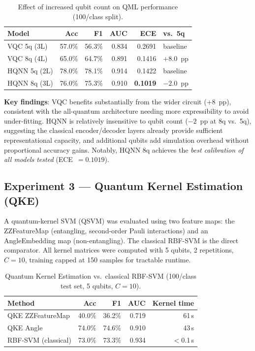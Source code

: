 \documentclass[journal]{IEEEtran}
\begin{document}
\begin{table}[H]
\centering
\caption{Effect of increased qubit count on QML performance (100/class split).}
\begin{tabular}{lrrrrl}
\toprule
\textbf{Model} & \textbf{Acc} & \textbf{F1} & \textbf{AUC} & \textbf{ECE} & \textbf{vs.\ 5q} \\
\midrule
VQC 5q (3L)  & 57.0\% & 56.3\% & 0.834 & 0.2691 & baseline \\
VQC 8q (4L)  & 65.0\% & 64.7\% & 0.891 & 0.1416 & $+8.0$~pp \\
\midrule
HQNN 5q (2L) & 78.0\% & 78.1\% & 0.914 & 0.1422 & baseline \\
HQNN 8q (3L) & 76.0\% & 75.3\% & 0.910 & \textbf{0.1019} & $-2.0$~pp \\
\bottomrule
\end{tabular}
\end{table}

\noindent\textbf{Key findings}: VQC benefits substantially from the wider circuit
($+8$~pp), consistent with the all-quantum architecture needing more
expressibility to avoid under-fitting. HQNN is relatively insensitive to qubit
count ($-2$~pp at 8q vs.\ 5q), suggesting the classical encoder/decoder layers
already provide sufficient representational capacity, and additional qubits add
simulation overhead without proportional accuracy gains. Notably, HQNN 8q
achieves the \emph{best calibration of all models tested} (ECE~$= 0.1019$).

\subsection{Experiment 3 — Quantum Kernel Estimation (QKE)}

A quantum-kernel SVM (QSVM) was evaluated using two feature maps: the
ZZFeatureMap (entangling, second-order Pauli interactions) and an AngleEmbedding
map (non-entangling). The classical RBF-SVM is the direct comparator.
All kernel matrices were computed with 5 qubits, 2 repetitions, $C = 10$,
training capped at 150 samples for tractable runtime.

\begin{table}[H]
\centering
\caption{Quantum Kernel Estimation vs.\ classical RBF-SVM
         (100/class test set, 5 qubits, $C = 10$).}
\begin{tabular}{lrrrr}
\toprule
\textbf{Method} & \textbf{Acc} & \textbf{F1} & \textbf{AUC} & \textbf{Kernel time} \\
\midrule
QKE ZZFeatureMap & 40.0\% & 36.2\% & 0.719 & 61\,s \\
QKE Angle        & 74.0\% & 74.6\% & 0.910 & 43\,s \\
RBF-SVM (classical) & 73.0\% & 73.3\% & 0.934 & $<$0.1\,s \\
\bottomrule
\end{tabular}
\end{table}
\end{document}
